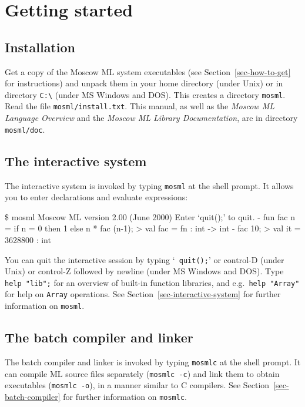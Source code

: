\documentclass[fleqn,a4paper]{article}
\begin{document}
\vfill


\newpage

\section{Getting started}
\label{sec-getting-started}

\subsection{Installation}

Get a copy of the Moscow ML system executables (see
Section~\ref{sec-how-to-get} for instructions) and unpack them in your
home directory (under Unix) or in directory \verb#C:\# (under MS
Windows and DOS)\@.  This creates a directory {\tt mosml}.  Read the
file {\tt mosml/install.txt}.  This manual, as well as the {\em Moscow
  ML Language Overview\/} and the \emph{Moscow ML Library
  Documentation}, are in directory {\tt mosml/doc}.


\subsection{The interactive system}

The interactive system is invoked by typing {\tt mosml} at the shell
prompt.  It allows you to enter declarations and evaluate expressions:

\begin{program}
\$ mosml
Moscow ML version 2.00 (June 2000)
Enter `quit();' to quit.
-  fun fac n = if n = 0 then 1 else n * fac (n-1);
> val fac = fn : int -> int
-  fac 10;
> val it = 3628800 : int
\end{program}

\noindent You can quit the interactive session by typing `{\tt
  quit();}' or control-D (under Unix) or control-Z followed by newline
(under MS Windows and DOS)\@.  Type {\tt help "lib";} for an overview
of built-in function libraries, and e.g.\ {\tt help "Array"} for help
on {\tt Array} operations.  See Section~\ref{sec-interactive-system}
for further information on {\tt mosml}.


\subsection{The batch compiler and linker}

The batch compiler and linker is invoked by typing {\tt mosmlc} at the
shell prompt.  It can compile ML source files separately ({\tt mosmlc
  -c}) and link them to obtain executables ({\tt mosmlc -o}), in a
manner similar to C compilers.  See Section~\ref{sec-batch-compiler}
for further information on {\tt mosmlc}.
\end{document}
